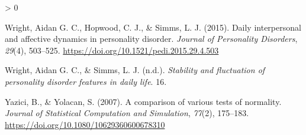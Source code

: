 \documentclass[
  english,
  man]{apa6}
\newlength{\cslhangindent}
\newenvironment{CSLReferences}[2] %
 {%
  \setlength{\parindent}{0pt}
  \ifodd #1 \everypar{\setlength{\hangindent}{\cslhangindent}}\ignorespaces\fi
  \ifnum #2 > 0
  \setlength{\parskip}{#2\baselineskip}
  \fi
 }%
 {}
\begin{document}
\begin{CSLReferences}{1}{0}
\leavevmode\hypertarget{ref-WrightEtAl2015}{}%
Wright, Aidan G. C., Hopwood, C. J., \& Simms, L. J. (2015). Daily interpersonal and affective dynamics in personality disorder. \emph{Journal of Personality Disorders}, \emph{29}(4), 503--525. \url{https://doi.org/10.1521/pedi.2015.29.4.503}

\leavevmode\hypertarget{ref-WrightSimms}{}%
Wright, Aidan G. C., \& Simms, L. J. (n.d.). \emph{Stability and fluctuation of personality disorder features in daily life}. 16.

\leavevmode\hypertarget{ref-YaziciYolacan2007}{}%
Yazici, B., \& Yolacan, S. (2007). A comparison of various tests of normality. \emph{Journal of Statistical Computation and Simulation}, \emph{77}(2), 175--183. \url{https://doi.org/10.1080/10629360600678310}

\end{CSLReferences}

\endgroup


\clearpage
\renewcommand{\listfigurename}{Figure captions}

\clearpage
\renewcommand{\listtablename}{Table captions}
\end{document}
